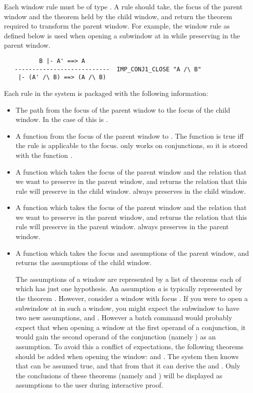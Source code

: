 Each window rule must be of type .
A rule should take, the focus of the parent window and the theorem held
by the child window, and return the theorem required to transform the parent
window.
For example, the window rule  as defined below is used
when opening a subwindow at  in  while preserving
 in the parent window.
\begin{verbatim}
          B |- A' ==> A
   ---------------------------  IMP_CONJ1_CLOSE "A /\ B" 
    |- (A' /\ B) ==> (A /\ B)
\end{verbatim}
Each rule in the system is packaged with the following information:
\begin{itemize}
	\item	The path from the focus of the parent window to the focus
		of the child window.
		In the case of  this is 
		.
	\item	A function from the focus of the parent window to .
		The function is true iff the rule is applicable to the
		focus.
		 only works on conjunctions,
		so it is stored with the function .
	\item	A function which takes the focus of the parent window and
		the relation that we want to preserve in the parent window,
		and returns the relation that this rule will preserve in
		the child window.
		 always preserves  in the
		child window.
	\item	A function which takes the focus of the parent window and
		the relation that we want to preserve in the parent window,
		and returns the relation that this rule will preserve in
		the parent window.
		 always preserves  in the
		parent window.
	\item	A function which takes the focus and assumptions of the
		parent window, and returns the assumptions of the 
		child window.

		The assumptions of a window are represented by a list of
		theorems each of which has just one hypothesis.
		An assumption {\it a}\/ is typically represented by the
		theorem .
		However, consider a window with focus
		.
		If you were to open a subwindow at  in such a 
		window, you might expect the subwindow to have two new
		assumptions,  and .
		However a batch command would probably expect that when
		opening a window at the first operand of a conjunction, it
		would gain the second operand of the conjunction
		(namely ) as an assumption.
		To avoid this a conflict of expectations, the following
		theorems should be added when opening the window:
		 and
		.
		The system then knows that  can
		be assumed true, and that from that it can derive the
		 and .
		Only the conclusions of these theorems 
		(namely  and ) will be displayed as
		assumptions to the user during interactive proof.


\end{itemize}
